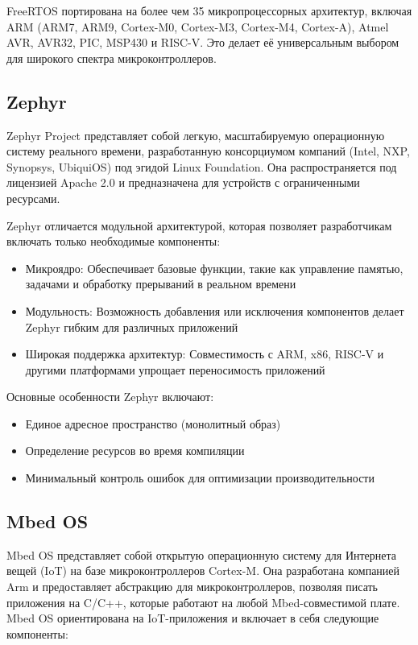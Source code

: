 FreeRTOS портирована на более чем 35 микропроцессорных архитектур, включая ARM (ARM7, ARM9, Cortex-M0, Cortex-M3, Cortex-M4, Cortex-A), Atmel AVR, AVR32, PIC, MSP430 и RISC-V\cite{Harris2021}. Это делает её универсальным выбором для широкого спектра микроконтроллеров.

\subsection{Zephyr}

Zephyr Project представляет собой легкую, масштабируемую операционную систему реального времени, разработанную консорциумом компаний (Intel, NXP, Synopsys, UbiquiOS) под эгидой Linux Foundation\cite{MartinArch2024}. Она распространяется под лицензией Apache 2.0 и предназначена для устройств с ограниченными ресурсами.

Zephyr отличается модульной архитектурой, которая позволяет разработчикам включать только необходимые компоненты:

\begin{itemize}
	\item Микроядро: Обеспечивает базовые функции, такие как управление памятью, задачами и обработку прерываний в реальном времени
	\item Модульность: Возможность добавления или исключения компонентов делает Zephyr гибким для различных приложений
	\item Широкая поддержка архитектур: Совместимость с ARM, x86, RISC-V и другими платформами упрощает переносимость приложений
\end{itemize}

Основные особенности Zephyr включают:
\begin{itemize}
	\item Единое адресное пространство (монолитный образ)
	\item Определение ресурсов во время компиляции
	\item Минимальный контроль ошибок для оптимизации производительности
\end{itemize}

\subsection{Mbed OS}

Mbed OS представляет собой открытую операционную систему для Интернета вещей (IoT) на базе микроконтроллеров Cortex-M\cite{MartinCleanCode2024}. Она разработана компанией Arm и предоставляет абстракцию для микроконтроллеров, позволяя писать приложения на C/C++, которые работают на любой Mbed-совместимой плате. Mbed OS ориентирована на IoT-приложения и включает в себя следующие компоненты:


